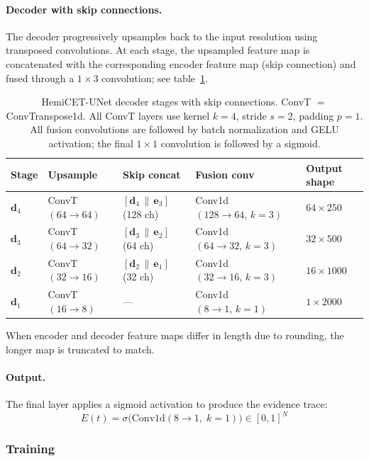 \paragraph{Decoder with skip connections.}
The decoder progressively upsamples back to the input resolution using transposed convolutions. At each stage, the upsampled feature map is concatenated with the corresponding encoder feature map (skip connection) and fused through a $1 \times 3$ convolution; see table~\ref{tab:hemicet_decoder}.

\begin{table}[h]
\centering
\caption{HemiCET-UNet decoder stages with skip connections. ConvT $=$ ConvTranspose1d. All ConvT layers use kernel $k{=}4$, stride $s{=}2$, padding $p{=}1$. All fusion convolutions are followed by batch normalization and GELU activation; the final $1 \times 1$ convolution is followed by a sigmoid.}
\label{tab:hemicet_decoder}
\begin{tabular}{lllll}
\hline
Stage & Upsample & Skip concat & Fusion conv & Output shape \\
\hline
$\mathbf{d}_4$ & ConvT$(64 \to 64)$ & $[\mathbf{d}_4 \,\|\, \mathbf{e}_3]$ (128 ch) & Conv1d$(128 \to 64,\, k{=}3)$  & $64 \times 250$ \\
$\mathbf{d}_3$ & ConvT$(64 \to 32)$ & $[\mathbf{d}_3 \,\|\, \mathbf{e}_2]$ (64 ch)  & Conv1d$(64 \to 32,\, k{=}3)$   & $32 \times 500$ \\
$\mathbf{d}_2$ & ConvT$(32 \to 16)$ & $[\mathbf{d}_2 \,\|\, \mathbf{e}_1]$ (32 ch)  & Conv1d$(32 \to 16,\, k{=}3)$   & $16 \times 1000$ \\
$\mathbf{d}_1$ & ConvT$(16 \to 8)$  & ---                                            & Conv1d$(8 \to 1,\, k{=}1)$     & $1 \times 2000$ \\
\hline
\end{tabular}
\end{table}

When encoder and decoder feature maps differ in length due to rounding, the longer map is truncated to match.

\paragraph{Output.}
The final layer applies a sigmoid activation to produce the evidence trace:
\[ E(t) = \sigma\!\big(\mathrm{Conv1d}(8 \to 1,\; k{=}1)\big) \in [0, 1]^N \tag{2} \]

\subsubsection{Training}

